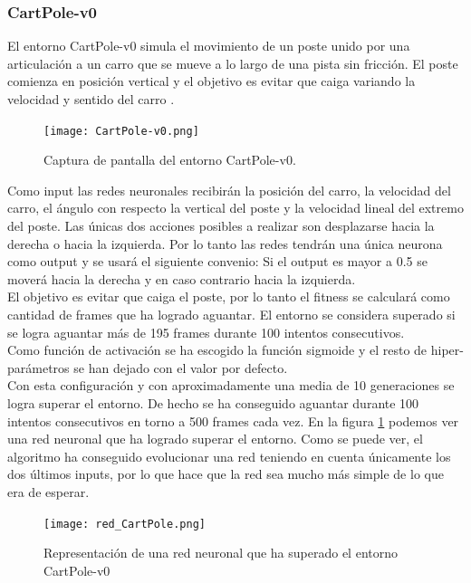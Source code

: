 \documentclass{article}
\begin{document}
\subsubsection{CartPole-v0}
El entorno CartPole-v0 simula el movimiento de un poste unido por una articulación a un carro que se mueve a lo largo de una pista sin fricción. El poste comienza en posición vertical y el objetivo es evitar que caiga variando la velocidad y sentido del carro \cite{CartPolev0openaigymWikiGitHub}.\\
\begin{figure}[htbp]
\centering
\texttt{[image: CartPole-v0.png]}
\caption{Captura de pantalla del entorno CartPole-v0.}
\end{figure}

Como input las redes neuronales recibirán la posición del carro, la velocidad del carro, el ángulo con respecto la vertical del poste y la velocidad lineal del extremo del poste. Las únicas dos acciones posibles a realizar son desplazarse hacia la derecha o hacia la izquierda. Por lo tanto las redes tendrán una única neurona como output y se usará el siguiente convenio: Si el output es mayor a 0.5 se moverá hacia la derecha y en caso contrario hacia la izquierda.\\

El objetivo es evitar que caiga el poste, por lo tanto   el fitness se calculará como cantidad de frames que ha logrado aguantar. El entorno se considera superado si se logra aguantar más de 195 frames durante 100 intentos consecutivos.\\

Como función de activación se ha escogido la función sigmoide y el resto de hiper-parámetros se han dejado con el valor por defecto.\\

Con esta configuración y con aproximadamente una media de 10 generaciones se logra superar el entorno. De hecho se ha conseguido aguantar durante 100 intentos consecutivos en torno a 500 frames cada vez. En la figura \ref{fig:red_CartPole} podemos ver una red neuronal que ha logrado superar el entorno. Como se puede ver, el algoritmo ha conseguido evolucionar una red teniendo en cuenta únicamente los dos últimos inputs, por lo que hace que la red sea mucho más simple de lo que era de esperar.

\begin{figure}[htbp]
\centering
\texttt{[image: red\_CartPole.png]}
\caption{Representación de una red neuronal que ha superado el entorno CartPole-v0}
\label{fig:red_CartPole}
\end{figure}
\end{document}
